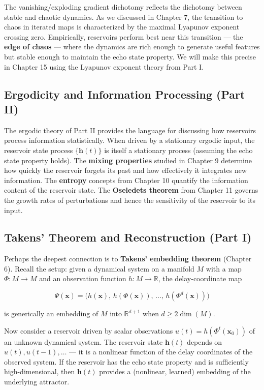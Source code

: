 The vanishing/exploding gradient dichotomy reflects the dichotomy between stable and chaotic dynamics. As we discussed in Chapter 7, the transition to chaos in iterated maps is characterized by the maximal Lyapunov exponent crossing zero. Empirically, reservoirs perform best near this transition --- the \textbf{edge of chaos} --- where the dynamics are rich enough to generate useful features but stable enough to maintain the echo state property. We will make this precise in Chapter 15 using the Lyapunov exponent theory from Part I.

\subsection{Ergodicity and Information Processing (Part II)}\label{sec:13.6.3}

The ergodic theory of Part II provides the language for discussing how reservoirs process information statistically. When driven by a stationary ergodic input, the reservoir state process $\{\mathbf{h}(t)\}$ is itself a stationary process (assuming the echo state property holds). The \textbf{mixing properties} studied in Chapter 9 determine how quickly the reservoir forgets its past and how effectively it integrates new information. The \textbf{entropy} concepts from Chapter 10 quantify the information content of the reservoir state. The \textbf{Oseledets theorem} from Chapter 11 governs the growth rates of perturbations and hence the sensitivity of the reservoir to its input.

\subsection{Takens' Theorem and Reconstruction (Part I)}\label{sec:13.6.4}

Perhaps the deepest connection is to \textbf{Takens' embedding theorem} (Chapter 6). Recall the setup: given a dynamical system on a manifold $M$ with a map $\Phi: M \to M$ and an observation function $h: M \to \mathbb{R}$, the delay-coordinate map

\[
\Psi(\mathbf{x}) = \big(h(\mathbf{x}),\, h(\Phi(\mathbf{x})),\, \ldots,\, h(\Phi^{d}(\mathbf{x}))\big)
\]

is generically an embedding of $M$ into $\mathbb{R}^{d+1}$ when $d \geq 2\dim(M)$.

Now consider a reservoir driven by scalar observations $u(t) = h(\Phi^t(\mathbf{x}_0))$ of an unknown dynamical system. The reservoir state $\mathbf{h}(t)$ depends on $u(t), u(t-1), \ldots$ --- it is a nonlinear function of the delay coordinates of the observed system. If the reservoir has the echo state property and is sufficiently high-dimensional, then $\mathbf{h}(t)$ provides a (nonlinear, learned) embedding of the underlying attractor.

